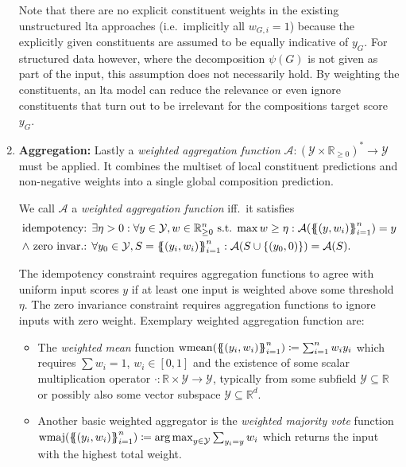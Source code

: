 \begin{enumerate}[label=\textbf{\arabic*.}]
		Note that there are no explicit constituent weights in the existing unstructured \ac{lta} approaches (i.e.\ implicitly all $w_{G, i} = 1$) because the explicitly given constituents are assumed to be equally indicative of $y_G$.
		For structured data however, where the decomposition $\psi(G)$ is not given as part of the input, this assumption does not necessarily hold.
		By weighting the constituents, an \ac{lta} model can reduce the relevance or even ignore constituents that turn out to be irrelevant for the compositions target score $y_G$.
	\item \textbf{Aggregation:}
		Lastly a \textit{weighted aggregation function} $\mathcal{A}: {(\mathcal{Y} \times \mathbb{R}_{\geq 0})}^{*} \to \mathcal{Y}$ must be applied.
		It combines the multiset of local constituent predictions and non-negative weights into a single global composition prediction.
		\begin{defn}\label{defn:ltag:weighted-agg}
			We call $\mathcal{A}$ a \textit{weighted aggregation function} iff.\ it satisfies
			\begin{align*}
				\text{idempotency: } & \exists \eta > 0: \forall y \in \mathcal{Y}, w \in \mathbb{R}_{\geq 0}^n\text{ s.t. }{\max w} \geq \eta: \mathcal{A}({\ldblbrace (y, w_i) \rdblbrace}_{i=1}^n) = y \\
				\land\text{ zero invar.: } & \forall y_0 \in \mathcal{Y}, S = {\ldblbrace (y_i, w_i) \rdblbrace}_{i=1}^n: \mathcal{A}(S \cup \{ (y_0, 0) \}) = \mathcal{A}(S) \text{.}
			\end{align*}
		\end{defn}
		{\setlength{\parskip}{0pt}The idempotency constraint requires aggregation functions to agree with uniform input scores $y$ if at least one input is weighted above some threshold $\eta$.
		The zero invariance constraint requires aggregation functions to ignore inputs with zero weight.
		Exemplary weighted aggregation function are:}
		\begin{itemize}
			\item The \textit{weighted mean} function $\wmean({\ldblbrace (y_i, w_i) \rdblbrace}_{i=1}^n) \coloneqq \sum_{i=1}^n w_i y_i$ which requires $\sum w_i = 1$, $w_i \in [0, 1]$ and the existence of some scalar multiplication operator $\cdot: \mathbb{R} \times \mathcal{Y} \to \mathcal{Y}$, typically from some subfield $\mathcal{Y} \subseteq \mathbb{R}$ or possibly also some vector subspace $\mathcal{Y} \subseteq \mathbb{R}^d$.
			\item Another basic weighted aggregator is the \textit{weighted majority vote} function $\wmaj({\ldblbrace (y_i, w_i) \rdblbrace}_{i=1}^n) \coloneqq {\arg\max}_{y \in \mathcal{Y}} \sum_{y_i = y} w_i$ which returns the input with the highest total weight.

\end{itemize}
\end{enumerate}
